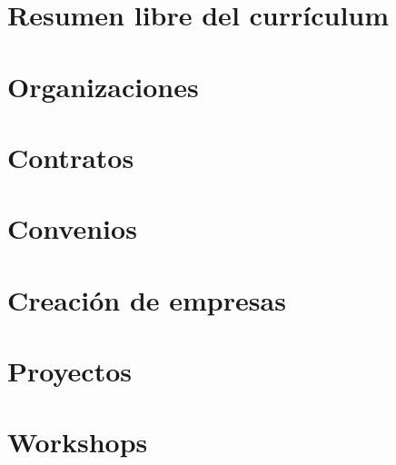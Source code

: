 \documentclass[a4paper]{article}
\begin{document}

\section{Resumen libre del currículum}


\renewcommand{\refname}{}

\section*{Organizaciones}
\label{sec:organizations}
\vspace{-5ex}


\section*{Contratos}
\label{sec:contratos}
\vspace{-5ex}


\section*{Convenios}
\label{sec:convenios}
\vspace{-5ex}


\section*{Creación de empresas}
\label{sec:proyectos}
\vspace{-5ex}


\section*{Proyectos}
\label{sec:proyectos}
\vspace{-5ex}


\section*{Workshops}
\vspace{-5ex}


\end{document}
